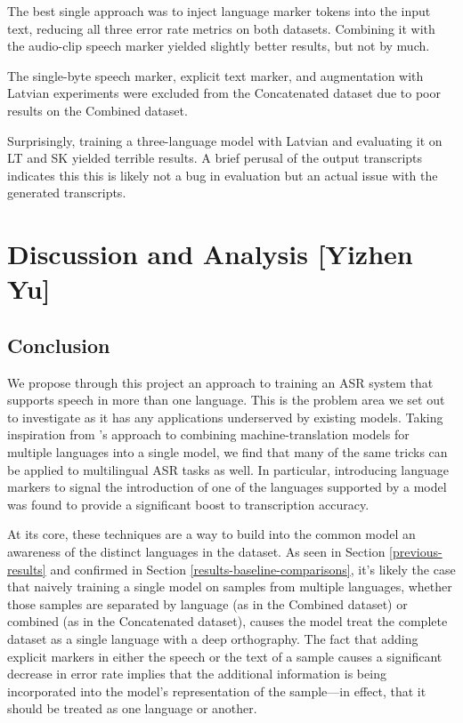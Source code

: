 \documentclass{article}
\begin{document}
  The best single approach was to inject language marker tokens into the input text, reducing all three error rate metrics on both datasets. Combining it with the audio-clip speech marker yielded slightly better results, but not by much.

  The single-byte speech marker, explicit text marker, and augmentation with Latvian experiments were excluded from the Concatenated dataset due to poor results on the Combined dataset.

  Surprisingly, training a three-language model with Latvian and evaluating it on LT and SK yielded terrible results. A brief perusal of the output transcripts indicates this this is likely not a bug in evaluation but an actual issue with the generated transcripts.
  \section{Discussion and Analysis [Yizhen Yu]}
  \subsection{Conclusion}
  We propose through this project an approach to training an ASR system that supports speech in more than one language. This is the problem area we set out to investigate as it has any applications underserved by existing models. Taking inspiration from \cite{Liu}'s approach to combining machine-translation models for multiple languages into a single model, we find that many of the same tricks can be applied to multilingual ASR tasks as well. In particular, introducing language markers to signal the introduction of one of the languages supported by a model was found to provide a significant boost to transcription accuracy.

  At its core, these techniques are a way to build into the common model an awareness of the distinct languages in the dataset. As seen in Section \ref{previous-results} and confirmed in Section \ref{results-baseline-comparisons}, it's likely the case that naively training a single model on samples from multiple languages, whether those samples are separated by language (as in the Combined dataset) or combined (as in the Concatenated dataset), causes the model treat the complete dataset as a single language with a deep orthography. The fact that adding explicit markers in either the speech or the text of a sample causes a significant decrease in error rate implies that the additional information is being incorporated into the model's representation of the sample---in effect, that it should be treated as one language or another.
\end{document}
